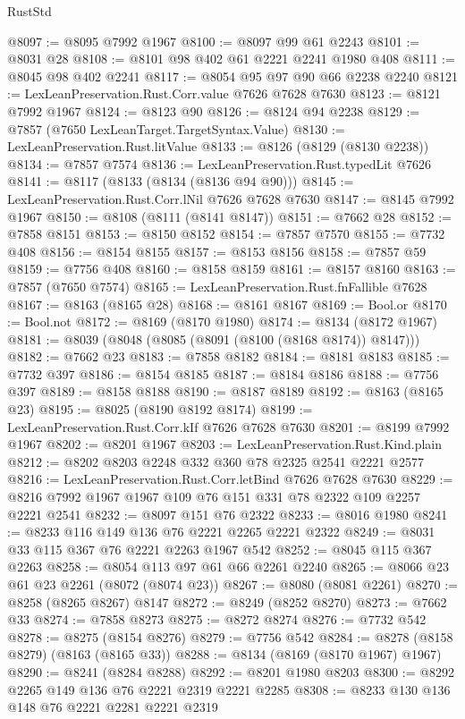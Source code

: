\begin{lexlean}{RustStd}
\begin{coremodule}
{\begin{coremodule}
{{{{{{{{{{{{{{{{{{{{{{{{{{{{{{{{{{{{{{{{{{{{{{{{{{{{{@8097 := @8095 @7992 @1967
@8100 := @8097 @99 @61 @2243
@8101 := @8031 @28
@8108 := @8101 @98 @402 @61 @2221 @2241 @1980 @408
@8111 := @8045 @98 @402 @2241
@8117 := @8054 @95 @97 @90 @66 @2238 @2240
@8121 := LexLeanPreservation.Rust.Corr.value @7626 @7628 @7630
@8123 := @8121 @7992 @1967
@8124 := @8123 @90
@8126 := @8124 @94 @2238
@8129 := @7857 (@7650 LexLeanTarget.TargetSyntax.Value)
@8130 := LexLeanPreservation.Rust.litValue
@8133 := @8126 (@8129 (@8130 @2238))
@8134 := @7857 @7574
@8136 := LexLeanPreservation.Rust.typedLit @7626
@8141 := @8117 (@8133 (@8134 (@8136 @94 @90)))
@8145 := LexLeanPreservation.Rust.Corr.lNil @7626 @7628 @7630
@8147 := @8145 @7992 @1967
@8150 := @8108 (@8111 (@8141 @8147))
@8151 := @7662 @28
@8152 := @7858 @8151
@8153 := @8150 @8152
@8154 := @7857 @7570
@8155 := @7732 @408
@8156 := @8154 @8155
@8157 := @8153 @8156
@8158 := @7857 @59
@8159 := @7756 @408
@8160 := @8158 @8159
@8161 := @8157 @8160
@8163 := @7857 (@7650 @7574)
@8165 := LexLeanPreservation.Rust.fnFallible @7628
@8167 := @8163 (@8165 @28)
@8168 := @8161 @8167
@8169 := Bool.or
@8170 := Bool.not
@8172 := @8169 (@8170 @1980)
@8174 := @8134 (@8172 @1967)
@8181 := @8039 (@8048 (@8085 (@8091 (@8100 (@8168 @8174)) @8147)))
@8182 := @7662 @23
@8183 := @7858 @8182
@8184 := @8181 @8183
@8185 := @7732 @397
@8186 := @8154 @8185
@8187 := @8184 @8186
@8188 := @7756 @397
@8189 := @8158 @8188
@8190 := @8187 @8189
@8192 := @8163 (@8165 @23)
@8195 := @8025 (@8190 @8192 @8174)
@8199 := LexLeanPreservation.Rust.Corr.kIf @7626 @7628 @7630
@8201 := @8199 @7992 @1967
@8202 := @8201 @1967
@8203 := LexLeanPreservation.Rust.Kind.plain
@8212 := @8202 @8203 @2248 @332 @360 @78 @2325 @2541 @2221 @2577
@8216 := LexLeanPreservation.Rust.Corr.letBind @7626 @7628 @7630
@8229 := @8216 @7992 @1967 @1967 @109 @76 @151 @331 @78 @2322 @109 @2257 @2221 @2541
@8232 := @8097 @151 @76 @2322
@8233 := @8016 @1980
@8241 := @8233 @116 @149 @136 @76 @2221 @2265 @2221 @2322
@8249 := @8031 @33 @115 @367 @76 @2221 @2263 @1967 @542
@8252 := @8045 @115 @367 @2263
@8258 := @8054 @113 @97 @61 @66 @2261 @2240
@8265 := @8066 @23 @61 @23 @2261 (@8072 (@8074 @23))
@8267 := @8080 (@8081 @2261)
@8270 := @8258 (@8265 @8267) @8147
@8272 := @8249 (@8252 @8270)
@8273 := @7662 @33
@8274 := @7858 @8273
@8275 := @8272 @8274
@8276 := @7732 @542
@8278 := @8275 (@8154 @8276)
@8279 := @7756 @542
@8284 := @8278 (@8158 @8279) (@8163 (@8165 @33))
@8288 := @8134 (@8169 (@8170 @1967) @1967)
@8290 := @8241 (@8284 @8288)
@8292 := @8201 @1980 @8203
@8300 := @8292 @2265 @149 @136 @76 @2221 @2319 @2221 @2285
@8308 := @8233 @130 @136 @148 @76 @2221 @2281 @2221 @2319
}}}}}}}}}}}}}}}}}}}}}}}}}}}}}}}}}}}}}}}}}}}}}}}}}}}}}
\end{coremodule}}
\end{coremodule}
\end{lexlean}
